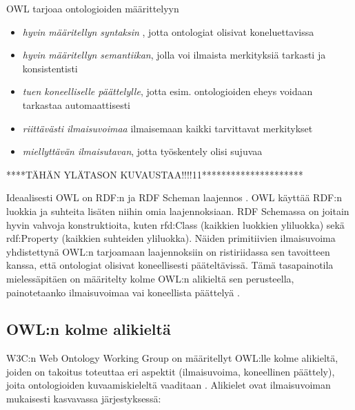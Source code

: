 \documentclass[finnish]{tktltiki2}
\theoremstyle{definition}
\theoremstyle{remark}
\begin{document}
OWL tarjoaa ontologioiden määrittelyyn \cite{AH09} 
\begin{itemize}
\item \textit{hyvin määritellyn syntaksin} , jotta ontologiat olisivat koneluettavissa
\item \textit{hyvin määritellyn semantiikan}, jolla voi ilmaista merkityksiä tarkasti ja konsistentisti
\item \textit{tuen koneelliselle päättelylle}, jotta esim.  ontologioiden eheys voidaan tarkastaa automaattisesti
\item \textit{riittävästi ilmaisuvoimaa} ilmaisemaan kaikki tarvittavat merkitykset
\item \textit{miellyttävän ilmaisutavan}, jotta työskentely olisi sujuvaa
\end{itemize}

****TÄHÄN YLÄTASON KUVAUSTAA!!!!11*********************

Ideaalisesti OWL on RDF:n ja RDF Scheman laajennos \cite{AH09}. OWL käyttää
RDF:n luokkia ja suhteita lisäten niihin omia laajennoksiaan. RDF Schemassa on joitain 
hyvin vahvoja konstruktioita, kuten rfd:Class
(kaikkien luokkien yliluokka) sekä rdf:Property (kaikkien suhteiden yliluokka).
Näiden primitiivien ilmaisuvoima yhdistettynä OWL:n tarjoamaan laajennoksiin
on ristiriidassa sen tavoitteen kanssa, että ontologiat olisivat koneellisesti
pääteltävissä. Tämä tasapainotila mielessäpitäen on määritelty kolme OWL:n
alikieltä sen perusteella, painotetaanko ilmaisuvoimaa vai koneellista päättelyä
\cite{AH09}.  

\subsection{OWL:n kolme alikieltä}

W3C:n Web Ontology Working Group on määritellyt OWL:lle kolme alikieltä, joiden
on takoitus toteuttaa eri aspektit (ilmaisuvoima, koneellinen päättely), joita
ontologioiden kuvaamiskieleltä vaaditaan \cite{MH04}. Alikielet ovat ilmaisuvoiman mukaisesti
kasvavassa järjestyksessä:
\end{document}
